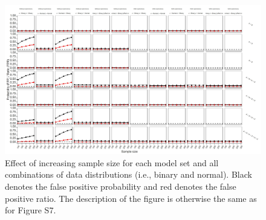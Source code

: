 \begin{figure}[hbt!]
\includegraphics{R/Analysis/Result/Figures/Figure1DSIBon.jpeg}
\centering
\caption{Effect of increasing sample size for each model set and all combinations of data distributions (i.e., binary and normal). Black denotes the false positive probability and red denotes the false positive ratio. The description of the figure is otherwise the same as for Figure S7.}
\label{fig:mainfigure}
\end{figure}
